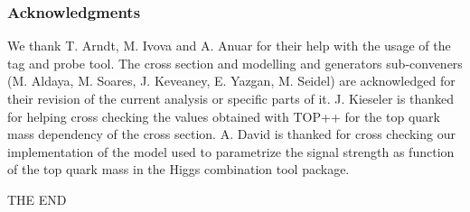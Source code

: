 \documentclass{beamer}
\begin{document}
\begin{frame}
\frametitle{Acknowledgments}
We thank T. Arndt, M. Ivova and A. Anuar for their help with the usage
of the tag and probe tool.
The cross section and modelling and generators sub-conveners
(M. Aldaya, M. Soares, J. Keveaney, E. Yazgan, M. Seidel)  are
acknowledged for their revision of
the current analysis or specific parts of it.
J. Kieseler is thanked for helping cross checking the values obtained
with {TOP++} for the top quark mass dependency of the cross
section.
A. David is thanked for cross checking our implementation of the model
used to parametrize the signal strength as function of the top quark
mass in the Higgs combination tool package.
\end{frame}

\begin{frame}
\Huge{\centerline{THE END}}
\end{frame}
\end{document}
